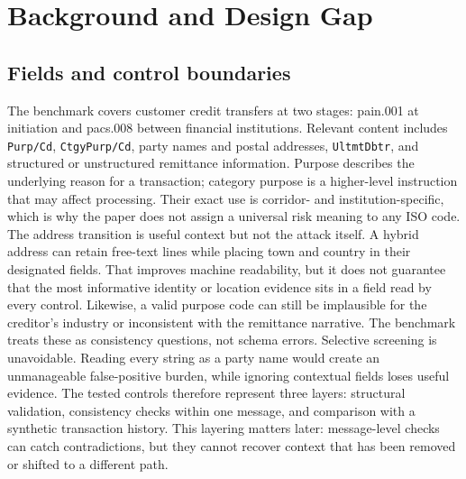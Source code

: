 \documentclass[conference]{IEEEtran}
\begin{document}
\section{Background and Design Gap}
\subsection{Fields and control boundaries}
The benchmark covers customer credit transfers at two stages: pain.001 at
initiation and pacs.008 between financial institutions. Relevant content
includes \texttt{Purp/Cd}, \texttt{CtgyPurp/Cd}, party names and postal
addresses, \texttt{UltmtDbtr}, and structured or unstructured remittance
information. Purpose describes the underlying reason for a transaction;
category purpose is a higher-level instruction that may affect processing.
Their exact use is corridor- and institution-specific, which is why the paper
does not assign a universal risk meaning to any ISO code.
The address transition is useful context but not the attack itself. A hybrid
address can retain free-text lines while placing town and country in their
designated fields. That improves machine readability, but it does not guarantee
that the most informative identity or location evidence sits in a field read
by every control. Likewise, a valid purpose code can still be implausible for
the creditor's industry or inconsistent with the remittance narrative. The
benchmark treats these as consistency questions, not schema errors.
Selective screening is unavoidable. Reading every string as a party name
would create an unmanageable false-positive burden, while ignoring contextual
fields loses useful evidence. The tested controls therefore represent three
layers: structural validation, consistency checks within one message, and
comparison with a synthetic transaction history. This layering matters later:
message-level checks can catch contradictions, but they cannot recover context
that has been removed or shifted to a different path.
\end{document}
